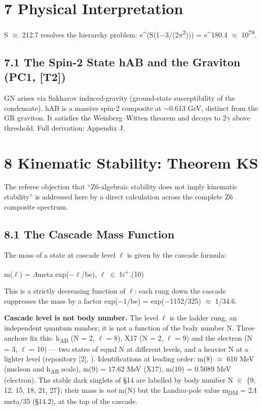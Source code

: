 \documentclass[11pt,letterpaper]{article}
\begin{document}
\section*{7  Physical Interpretation}

\noindent S $\approx$ 212.7 resolves the hierarchy problem: e\textasciicircum{}(S(1$-$3/(2$\pi$\textsuperscript{2}))) = e\textasciicircum{}180.4 $\approx$ 10\textsuperscript{78}.

\subsection*{7.1  The Spin-2 State hAB and the Graviton (PC1, [T2])}

\noindent GN arises via Sakharov induced-gravity (ground-state susceptibility of the condensate). hAB is a massive spin-2 composite at $\sim$0.613 GeV, distinct from the GR graviton. It satisfies the Weinberg--Witten theorem and decays to 2$\gamma$ above threshold. Full derivation: Appendix J.

\section*{8  Kinematic Stability: Theorem KS}

\noindent The referee objection that ``Z6-algebraic stability does not imply kinematic stability'' is addressed here by a direct calculation across the complete Z6 composite spectrum.

\subsection*{8.1  The Cascade Mass Function}

\noindent The mass of a state at cascade level $\ell$ is given by the cascade formula:

\begingroup\centering m($\ell$) = $\Lambda$meta exp($-\ell$/be),   $\ell$ $\in$ $\mathbb{N}$\textsuperscript{+}.\hspace{2em}(10)\par\endgroup

\noindent This is a strictly decreasing function of $\ell$: each rung down the cascade suppresses the mass by a factor exp($-$1/be) = exp($-$1152/325) $\approx$ 1/34.6.

\noindent \textbf{Cascade level is not body number.} The level $\ell$ is the ladder rung, an independent quantum number; it is not a function of the body number N. Three anchors fix this: h\textsubscript{AB} (N = 2, $\ell$ = 8), X17 (N = 2, $\ell$ = 9) and the electron (N = 3, $\ell$ = 10) --- two states of equal N at different levels, and a heavier N at a lighter level (repository [2], ). Identifications at leading order: m(8) $\approx$ 610 MeV (nucleon and h\textsubscript{AB} scale), m(9) = 17.62 MeV (X17), m(10) = 0.5089 MeV (electron). The stable dark singlets of §14 are labelled by body number N $\in$ \{9, 12, 15, 18, 21, 27\}; their mass is \emph{not} m(N) but the Landau-pole value m\textsubscript{DM} = 2$\Lambda$meta/35 (§14.2), at the top of the cascade.
\end{document}
